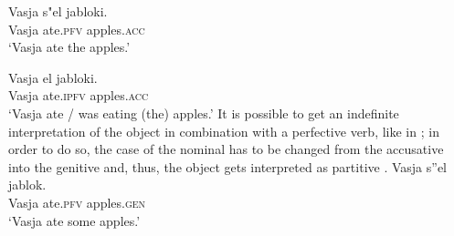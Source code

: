 \documentclass[output=paper]{langscibook}
\begin{document}
\ea \label{ex:seres:4}
\gll Vasja s"el		jabloki.\\
Vasja ate.\textsc{pfv}		apples.\textsc{acc}\\
\glt `Vasja ate the apples.'
\z

\ea \label{ex:seres:5}
\gll	Vasja	el			jabloki.\\
Vasja ate.\textsc{ipfv}  apples.\textsc{acc}\\
\glt `Vasja ate / was eating (the) apples.'
\z
\noindent It is possible to get an indefinite interpretation of the object in combination with a perfective verb, like in ; in order to do so, the case of the nominal has to be changed from the accusative into the genitive and, thus, the object gets interpreted as partitive .   %
\ea \label{ex:seres:6}
\gll Vasja s''el		jablok.\\
Vasja	ate.\textsc{pfv}		apples.\textsc{gen}\\
\glt `Vasja ate some apples.'
\z
\noindent
\noindent
\end{document}
